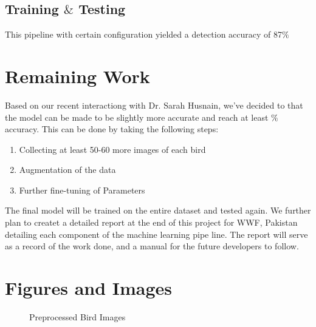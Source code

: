 \documentclass{article}
\begin{document}
    \subsection*{Training $\&$ Testing}
    
    This pipeline with certain configuration yielded a detection accuracy of 87$\%$


    \section*{Remaining Work}
    
    Based on our recent interactiong with Dr. Sarah Husnain, we've decided to that the model can be made to be slightly more accurate and reach at least $\%$ accuracy. This can be done by taking the following steps:
    \begin{enumerate}
        \item Collecting at least 50-60 more images of each bird
        \item Augmentation of the data
        \item Further fine-tuning of Parameters
    \end{enumerate}
    The final model will be trained on the entire dataset and tested again. We further plan to createt a detailed report at the end of this project for WWF, Pakistan detailing each component of the machine learning pipe line. The report will serve as a record of the work done, and a manual for the future developers to follow.
    \newpage
    \section*{Figures and Images}
        \begin{figure}[h!]
        \centering
        \caption{Preprocessed Bird Images}
        \label{Birds}
    \end{figure}
    
\end{document}
